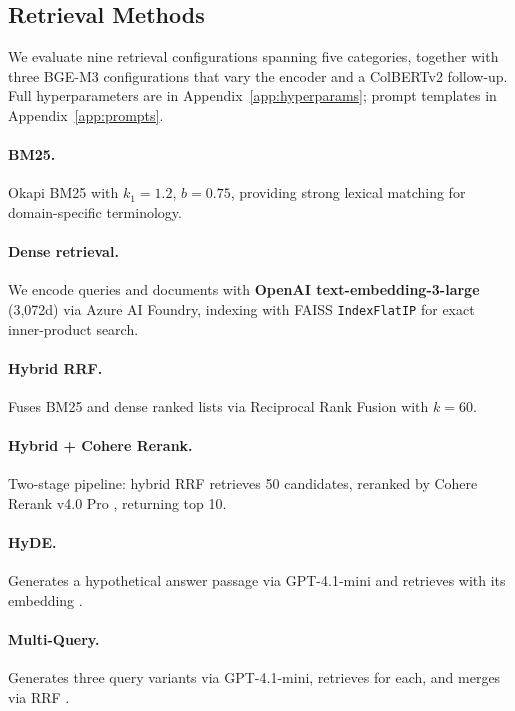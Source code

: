 \documentclass{article}
\begin{document}
\subsection{Retrieval Methods}
\label{sec:methods}

We evaluate nine retrieval configurations spanning five categories, together with three BGE-M3 configurations that vary the encoder and a ColBERTv2 follow-up. Full hyperparameters are in Appendix~\ref{app:hyperparams}; prompt templates in Appendix~\ref{app:prompts}.

\paragraph{BM25.} Okapi BM25 \citep{robertson1994okapi} with $k_1 = 1.2$, $b = 0.75$, providing strong lexical matching for domain-specific terminology.

\paragraph{Dense retrieval.} We encode queries and documents with \textbf{OpenAI text-embedding-3-large} (3,072d) via Azure AI Foundry, indexing with FAISS \texttt{IndexFlatIP} for exact inner-product search.

\paragraph{Hybrid RRF.} Fuses BM25 and dense ranked lists via Reciprocal Rank Fusion \citep{cormack2009rrf} with $k=60$.

\paragraph{Hybrid + Cohere Rerank.} Two-stage pipeline: hybrid RRF retrieves 50 candidates, reranked by Cohere Rerank v4.0 Pro \citep{cohere2025rerank4}, returning top 10.

\paragraph{HyDE.} Generates a hypothetical answer passage via GPT-4.1-mini and retrieves with its embedding \citep{gao2022hyde}.

\paragraph{Multi-Query.} Generates three query variants via GPT-4.1-mini, retrieves for each, and merges via RRF \citep{raudaschl2023ragfusion}.
\end{document}
